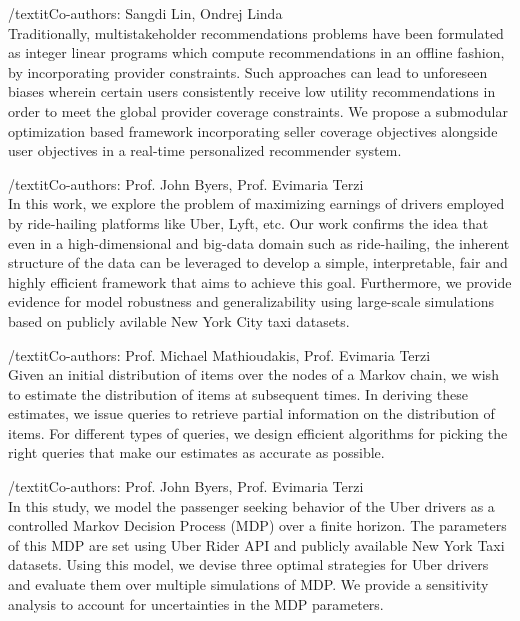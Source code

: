 \documentclass[10pt]{moderncv}
\begin{document}
{
    /textit{Co-authors: Sangdi Lin, Ondrej Linda}\\
    Traditionally, multistakeholder recommendations problems have been formulated as integer linear programs which 
        compute recommendations in an offline fashion, by incorporating provider constraints.
    Such approaches can lead to unforeseen biases wherein certain users consistently receive low utility 
        recommendations in order to meet the global provider coverage constraints. 
    We propose a submodular optimization based framework incorporating seller coverage objectives alongside user 
        objectives in a real-time personalized recommender system.
}

{
    /textit{Co-authors: Prof. John Byers, Prof. Evimaria Terzi}\\
    In this work, we explore the problem of maximizing earnings of drivers employed by ride-hailing platforms like 
        Uber, Lyft, etc. Our work confirms the idea that even in a high-dimensional and big-data domain such as 
        ride-hailing, the inherent structure of the data can be leveraged to develop a simple, interpretable, fair and 
        highly efficient framework that aims to achieve this goal. 
    Furthermore, we provide evidence for model robustness and generalizability using large-scale simulations based on 
        publicly avilable New York City taxi datasets.
}

{
    /textit{Co-authors: Prof. Michael Mathioudakis, Prof. Evimaria Terzi}\\
    Given an initial distribution of items over the nodes of a Markov chain, we wish to estimate the distribution of 
        items at subsequent times. In deriving these estimates, we issue queries to retrieve partial information on the 
        distribution of items. 
    For different types of queries, we design efficient algorithms for picking the right queries that make our 
        estimates as accurate as possible.
}

{
    /textit{Co-authors: Prof. John Byers, Prof. Evimaria Terzi}\\
    In this study, we model the passenger seeking behavior of the Uber drivers as a controlled Markov Decision Process 
        (MDP) over a finite horizon. 
    The parameters of this MDP are set using Uber Rider API and publicly available New York Taxi datasets.
    Using this model, we devise three optimal strategies for Uber drivers and evaluate them over multiple simulations 
        of MDP. 
    We provide a sensitivity analysis to account for uncertainties in the MDP parameters.
}
\end{document}
